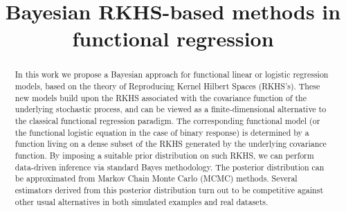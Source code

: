 \documentclass[ba]{imsart}
\numberwithin{equation}{section}
\theoremstyle{plain}
\begin{document}
\begin{frontmatter}
\title{Bayesian RKHS-based methods in functional regression}


\begin{abstract}
In this work we propose a Bayesian approach for functional linear or logistic  regression models, based on the theory of Reproducing Kernel Hilbert Spaces (RKHS's). These new models build upon the RKHS associated with the covariance function of the underlying stochastic process, and can be viewed as a finite-dimensional alternative to the classical functional regression paradigm. The corresponding functional model (or the functional logistic equation in the case of binary response) is determined by a function living on a dense subset of the RKHS generated by the underlying covariance function. By imposing a suitable prior distribution on such RKHS, we can perform data-driven inference via standard Bayes methodology. The posterior distribution can be approximated from Markov Chain Monte Carlo (MCMC) methods. Several estimators  derived from this posterior distribution turn out to be competitive against other usual  alternatives in both simulated examples and real datasets.
\end{abstract}

\begin{keyword}[class=MSC]
\end{keyword}

\begin{keyword}
\end{keyword}

\end{frontmatter}
\end{document}
